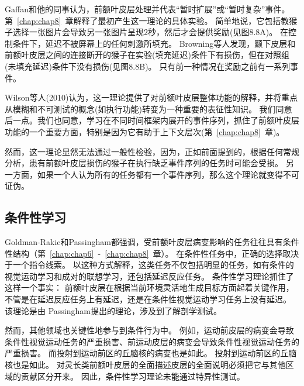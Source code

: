 Gaffan和他的同事认为，前额叶皮层处理并代表“暂时扩展”或“暂时复杂”事件\cite{browning2008prefrontal}。
第~\ref{chap:chap8}~章解释了最初产生这一理论的具体实验。
简单地说，它包括教猴子选择一张图片会导致另一张图片呈现2秒，然后才会提供奖励(见图8.8A)。
在控制条件下，延迟不被屏幕上的任何刺激所填充。
Browning等人发现，颞下皮层和前额叶皮层之间的连接断开的猴子在实验(填充延迟)条件下有损伤，但在对照组(未填充延迟)条件下没有损伤(见图8.8B)。
只有前一种情况在奖励之前有一系列事件。
\par


Wilson等人(2010)认为，这一理论提供了对前额叶皮层整体功能的解释，并将重点从模糊和不可测试的概念(如执行功能)转变为一种重要的表征性知识。
我们同意后一点。我们也同意，学习在不同时间框架内展开的事件序列，抓住了前额叶皮层功能的一个重要方面，特别是因为它有助于上下文层次(第~\ref{chap:chap8}~章)。
\par


然而，这一理论显然无法通过一般性检验，因为，正如前面提到的，根据任何常规分析，患有前额叶皮层损伤的猴子在执行缺乏事件序列的任务时可能会受损。
另一方面，如果一个人认为所有的任务都有一个事件序列，那么这个理论就变得不可证伪。



\subsection{条件性学习}

Goldman-Rakic\cite{goldman2011circuitry}和Passingham\cite{passingham1995frontal}都强调，受前额叶皮层病变影响的任务往往具有条件性结构（第~\ref{chap:chap6}~-~\ref{chap:chap8}~章）。
在条件性任务中，正确的选择取决于一个指令线索。
以这种方式解释，这类任务不仅包括明显的任务，如有条件的视觉运动学习和成对的联想学习，还包括延迟反应任务。
条件性学习理论抓住了这样一个事实：
前额叶皮层在根据当前环境灵活地生成目标方面起着关键作用，不管是在延迟反应任务上有延迟，还是在条件性视觉运动学习任务上没有延迟。
该理论是由 Passingham\cite{passingham1995frontal}提出的理论，涉及到了解剖学测试。
\par


然而，其他领域也关键性地参与到条件行为中。
例如，运动前皮层的病变会导致条件性视觉运动任务的严重损害、前运动皮层的病变会导致条件性视觉运动任务的严重损害\cite{halsband1985premotor,petrides2019conditional}。
而投射到运动前区的丘脑核的病变也是如此。
投射到运动前区的丘脑核也是如此\cite{canavan1989motor}。
对灵长类前额叶皮层的全面描述皮层的全面说明必须把它与其他区域的贡献区分开来。
因此，条件性学习理论未能通过特异性测试。
\par


